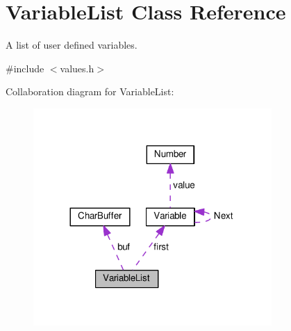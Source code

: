 \hypertarget{classVariableList}{}\section{Variable\+List Class Reference}
\label{classVariableList}


A list of user defined variables.  




{\ttfamily \#include $<$values.\+h$>$}



Collaboration diagram for Variable\+List\+:\nopagebreak
\begin{figure}[H]
\begin{center}
\leavevmode
\includegraphics[width=257pt]{classVariableList__coll__graph}
\end{center}
\end{figure}
